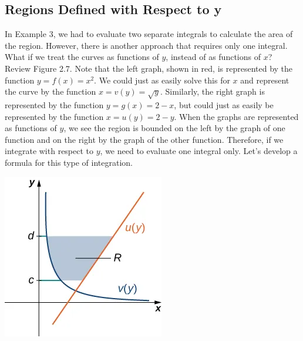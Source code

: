 \documentclass{report}
\begin{document}
    \pagebreak
    \subsection*{Regions Defined with Respect to y}
    \bigbreak \noindent 
    In Example 3, we had to evaluate two separate integrals to calculate the area of the region. However, there is another approach that requires only one integral. What if we treat the curves as functions of \( y \), instead of as functions of \( x \)?
    \bigbreak \noindent 
    Review Figure 2.7. Note that the left graph, shown in red, is represented by the function \( y = f(x) = x^2 \).
    We could just as easily solve this for \( x \) and represent the curve by the function \( x = v(y) = \sqrt{y} \).
    \bigbreak \noindent 
    \bigbreak \noindent 
    Similarly, the right graph is represented by the function \( y = g(x) = 2 - x \), but could just as easily be represented by the function \( x = u(y) = 2 - y \).
    \bigbreak \noindent 
    When the graphs are represented as functions of $y$, we see the region is bounded on the left by the graph of one function and on the right by the graph of the other function. Therefore, if we integrate with respect to $y$, we need to evaluate one integral only. Let’s develop a formula for this type of integration.
    \bigbreak \noindent \bigbreak \noindent  
    \begin{minipage}{0.47\textwidth}
        \begin{center}
            \includegraphics[scale=0.6]{./figures/graph5.png}
        \end{center}
    \end{minipage}
\end{document}
